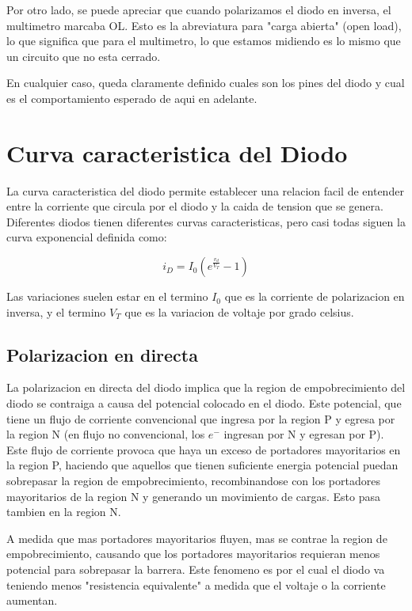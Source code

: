 \documentclass[chaptersright]{informeutn}
\begin{document}
    Por otro lado, se puede apreciar que cuando polarizamos el diodo en inversa, el multimetro marcaba OL. Esto es la
    abreviatura para "carga abierta" (open load), lo que significa que para el multimetro, lo que estamos midiendo es
    lo mismo que un circuito que no esta cerrado.

    En cualquier caso, queda claramente definido cuales son los pines del diodo y cual es el comportamiento esperado
    de aqui en adelante.


  \chapter{Curva caracteristica del Diodo}
    La curva caracteristica del diodo permite establecer una relacion facil de entender entre la corriente que circula
    por el diodo y la caida de tension que se genera. Diferentes diodos tienen diferentes curvas caracteristicas, pero
    casi todas siguen la curva exponencial definida como:

    \begin{equation}
      i_D = I_0 \left(e^{\frac{v_d}{V_T}} - 1 \right)
      \label{eq.caracteristica}
    \end{equation}

    Las variaciones suelen estar en el termino $I_0$ que es la corriente de polarizacion en inversa, y el termino $V_T$
    que es la variacion de voltaje por grado celsius.

    \section{Polarizacion en directa}
      La polarizacion en directa del diodo implica que la region de empobrecimiento del diodo se contraiga a causa del
      potencial colocado en el diodo. Este potencial, que tiene un flujo de corriente convencional que ingresa por la
      region P y egresa por la region N (en flujo no convencional, los $e^-$ ingresan por N y egresan por P). Este
      flujo de corriente provoca que haya un exceso de portadores mayoritarios en la region P, haciendo que aquellos
      que tienen suficiente energia potencial puedan sobrepasar la region de empobrecimiento, recombinandose con los
      portadores mayoritarios de la region N y generando un movimiento de cargas. Esto pasa tambien en la region N.

      A medida que mas portadores mayoritarios fluyen, mas se contrae la region de empobrecimiento, causando que los
      portadores mayoritarios requieran menos potencial para sobrepasar la barrera. Este fenomeno es por el cual el
      diodo va teniendo menos "resistencia equivalente" a medida que el voltaje o la corriente aumentan.
\end{document}
